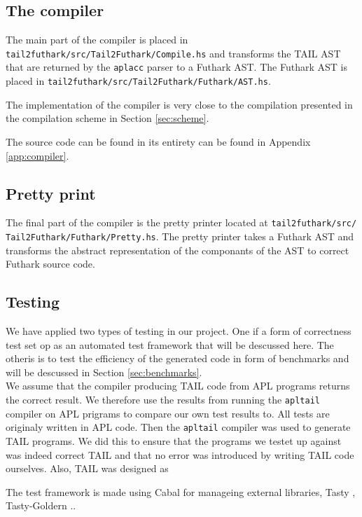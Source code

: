 \documentclass[11pt]{article}
\begin{document}
\subsection{The compiler}
The main part of the compiler is placed in {\tt tail2futhark/src/Tail2Futhark/Compile.hs} and transforms the TAIL AST that are returned by the {\tt aplacc} parser to a Futhark AST. The Futhark AST is placed in {\tt tail2futhark/src/Tail2Futhark/Futhark/AST.hs}.

The implementation of the compiler is very close to the compilation presented in the compilation scheme in Section  \ref{sec:scheme}. 

% 

The source code can be found in its entirety can be found in Appendix \ref{app:compiler}.

\subsection{Pretty print}
The final part of the compiler is the pretty printer located at {\tt tail2futhark/src/
Tail2Futhark/Futhark/Pretty.hs}. 
The pretty printer takes a Futhark AST and transforms the abstract representation of the componants of the AST to correct Futhark source code. 

\subsection{Testing}
We have applied two types of testing in our project. One if a form of correctness test set op as an automated test
framework that will be descussed here. The otheris is to test the efficiency of the generated code in form of benchmarks and will be descussed in Section \ref{sec:benchmarks}. \\


We assume that the compiler producing TAIL code from APL programs returns the correct result. We therefore use the results from running the {\tt apltail} compiler on APL prigrams to compare our own test results to. All tests are originaly written in APL code. Then the {\tt apltail} compiler was used to generate TAIL programs. We did this to ensure that the programs we testet up against was indeed correct TAIL and that no error was introduced by writing TAIL code ourselves. Also, TAIL was designed as

The test framework is made using Cabal \cite{cabal} for manageing external libraries,  Tasty  \cite{tasty}, Tasty-Goldern \cite{tasty-golden}  .. \\
\end{document}
